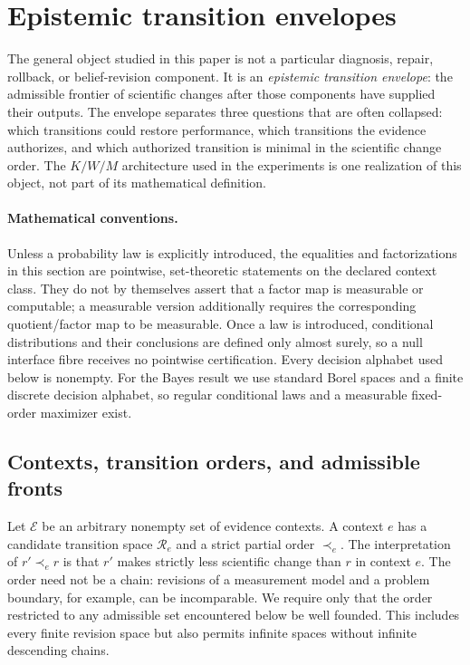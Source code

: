 \section{Epistemic transition envelopes}
\label{sec:escalation-theory}

The general object studied in this paper is not a particular diagnosis,
repair, rollback, or belief-revision component. It is an
\emph{epistemic transition envelope}: the admissible frontier of scientific
changes after those components have supplied their outputs. The envelope
separates three questions that are often collapsed: which transitions could
restore performance, which transitions the evidence authorizes, and which
authorized transition is minimal in the scientific change order. The
$K/W/M$ architecture used in the experiments is one realization of this
object, not part of its mathematical definition.

\paragraph{Mathematical conventions.}
Unless a probability law is explicitly introduced, the equalities and
factorizations in this section are pointwise, set-theoretic statements on the
declared context class. They do not by themselves assert that a factor map is
measurable or computable; a measurable version additionally requires the
corresponding quotient/factor map to be measurable. Once a law is introduced,
conditional distributions and their conclusions are defined only almost
surely, so a null interface fibre receives no pointwise certification. Every
decision alphabet used below is nonempty. For the Bayes result we use standard
Borel spaces and a finite discrete decision alphabet, so regular conditional
laws and a measurable fixed-order maximizer exist.

\subsection{Contexts, transition orders, and admissible fronts}

Let $\mathcal E$ be an arbitrary nonempty set of evidence contexts. A context
$e$ has a candidate transition space $\mathcal R_e$ and a strict partial order
$\prec_e$. The interpretation of $r'\prec_e r$ is that $r'$ makes strictly
less scientific change than $r$ in context $e$. The order need not be a
chain: revisions of a measurement model and a problem boundary, for example,
can be incomparable. We require only that the order restricted to any
admissible set encountered below be well founded. This includes every finite
revision space but also permits infinite spaces without infinite descending
chains.

